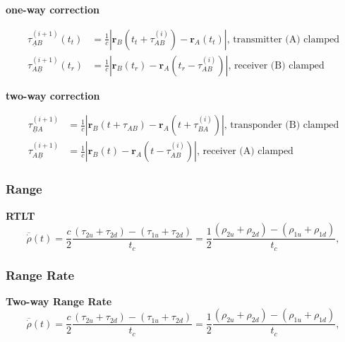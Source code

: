 \textbf{one-way correction}

\begin{equation}
    \begin{aligned}
        \tau_{\underline{A}B}^{(i+1)}(t_t) & = \frac{1}{c}|\bm{r}_B(t_t+\tau_{AB}^{(i)})-\bm{r}_A(t_t)|\text{, transmitter (A) clamped} \\
        \tau_{A\underline{B}}^{(i+1)}(t_r) & = \frac{1}{c}|\bm{r}_B(t_r)-\bm{r}_A(t_r-\tau_{AB}^{(i)})|\text{, receiver (B) clamped}
    \end{aligned}
\end{equation}

\textbf{two-way correction}

\begin{equation}
    \begin{aligned}
        \tau_{\underline{B}A}^{(i+1)} & = \frac{1}{c}|\bm{r}_B(t+\tau_{AB})-\bm{r}_A(t+\tau_{BA}^{(i)})|\text{, transponder (B) clamped} \\
        \tau_{A\underline{B}}^{(i+1)} & = \frac{1}{c}|\bm{r}_B(t)-\bm{r}_A(t-\tau_{AB}^{(i)})|\text{, receiver (A) clamped}
    \end{aligned}
\end{equation}

\subsubsection{Range}

\textbf{RTLT}
\begin{equation}
    \overline{\dot{\rho}}(t) = \frac{c}{2}\frac{(\tau_{2u}+\tau_{2d})-(\tau_{1u}+\tau_{2d})}{t_c} = \frac{1}{2}\frac{(\rho_{2u}+\rho_{2d})-(\rho_{1u} + \rho_{1d})}{t_c},
\end{equation}


\subsubsection{Range Rate}

\textbf{Two-way Range Rate}
\begin{equation}
    \overline{\dot{\rho}}(t) = \frac{c}{2}\frac{(\tau_{2u}+\tau_{2d})-(\tau_{1u}+\tau_{2d})}{t_c} = \frac{1}{2}\frac{(\rho_{2u}+\rho_{2d})-(\rho_{1u} + \rho_{1d})}{t_c},
\end{equation}

